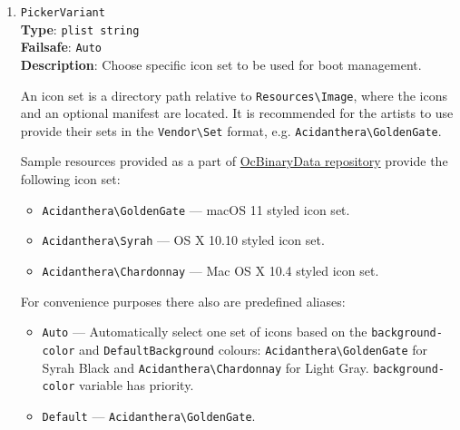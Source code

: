 \documentclass[]{article}
\providecommand{\tightlist}{%
  \setlength{\itemsep}{0pt}\setlength{\parskip}{0pt}}
\begin{document}
\begin{enumerate}
  \emph{Note 3}: On Macs with problematic GOP, it may be difficult to re-bless MaxRegner if its bless status
  is lost. The \texttt{BootKicker} utility can be used to work around this problem, if set up as a Tool
  in MaxRegner with \texttt{FullNvramAccess} enabled. It will launch the Apple picker,
  which allows selection of an item to boot next (with \texttt{Enter}), or next and from then on until
  the next change (with \texttt{CTRL+Enter}). Note that after the selection is made, the system
  \emph{will reboot} before the chosen entry is booted. While this behaviour might seem surprising,
  it can be used both to switch which MaxRegner installation is blessed, with \texttt{CTRL+Enter},
  e.g. from a recovery MaxRegner installation on CD (selected with the \texttt{C} key on boot) back
  to the main installation of MaxRegner on the hard drive, if this is lost after an NVRAM reset. It can
  also be used, even when the native picker cannot be shown normally (unsupported GPU), to do a one-shot
  boot without MaxRegner, e.g. to another OS or tool, or to an earlier version of macOS.

\item
  \texttt{PickerVariant}\\
  \textbf{Type}: \texttt{plist\ string}\\
  \textbf{Failsafe}: \texttt{Auto}\\
  \textbf{Description}: Choose specific icon set to be used for boot management.

  An icon set is a directory path relative to \texttt{Resources\textbackslash Image},
  where the icons and an optional manifest are located. It is recommended for
  the artists to use provide their sets in the \texttt{Vendor\textbackslash Set} format,
  e.g. \texttt{Acidanthera\textbackslash GoldenGate}.

  Sample resources provided as a part of
  \href{https://github.com/acidanthera/OcBinaryData}{OcBinaryData repository}
  provide the following icon set:
  \begin{itemize}
    \tightlist
    \item \texttt{Acidanthera\textbackslash GoldenGate} --- macOS 11 styled icon set.
    \item \texttt{Acidanthera\textbackslash Syrah} --- OS X 10.10 styled icon set.
    \item \texttt{Acidanthera\textbackslash Chardonnay} --- Mac OS X 10.4 styled icon set.
  \end{itemize}

  For convenience purposes there also are predefined aliases:
  \begin{itemize}
    \tightlist
    \item \texttt{Auto} --- Automatically select one set of icons based on the \texttt{background-color}
      and \texttt{DefaultBackground} colours: \texttt{Acidanthera\textbackslash GoldenGate} for Syrah Black and
      \texttt{Acidanthera\textbackslash Chardonnay} for Light Gray. \texttt{background-color} variable has
      priority.
    \item \texttt{Default} --- \texttt{Acidanthera\textbackslash GoldenGate}.
  \end{itemize}


\end{enumerate}
\end{document}
